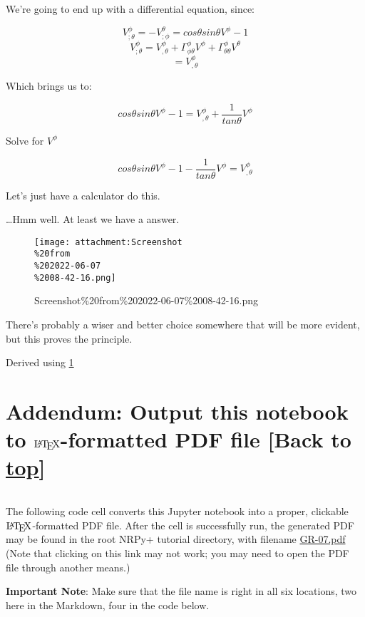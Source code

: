 \documentclass[landscape,letterpaper,10pt,english]{article}
\let\Oldlatex\LaTeX
\renewcommand{\LaTeX}{\textrm{\Oldlatex}}
\begin{document}
We're going to end up with a differential equation, since:

\[ V^\phi_{;\theta} = -V^\theta_{;\phi} = cos\theta sin\theta V^\phi - 1 \]
\[ V^\phi_{;\theta} = V^\phi_{,\theta} + \Gamma^\phi_{\phi\theta} V^\phi + \Gamma^\phi_{\theta\theta} V^\theta \]
\[ = V^\phi_{,\theta}\]

Which brings us to:

\[ cos\theta sin\theta V^\phi - 1 = V^\phi_{,\theta} + \frac{1}{tan\theta} V^\phi\]

Solve for \(V^\phi\)

    \[ cos\theta sin\theta V^\phi - 1 - \frac{1}{tan\theta} V^\phi = V^\phi_{,\theta} \]

Let's just have a calculator do this.

\ldots Hmm well. At least we have a answer.

\begin{figure}
\centering
\texttt{[image: attachment:Screenshot\\\%20from\\\%202022-06-07\\\%2008-42-16.png]}
\caption{Screenshot\%20from\%202022-06-07\%2008-42-16.png}
\end{figure}

There's probably a wiser and better choice somewhere that will be more
evident, but this proves the principle.

Derived using \hyperref[1]{1}

    \hypertarget{addendum-output-this-notebook-to-latex-formatted-pdf-file-back-to-top}{%
\section{\texorpdfstring{Addendum: Output this notebook to
\(\LaTeX\)-formatted PDF file {[}Back to
\hyperref[toc]{top}{]}}{Addendum: Output this notebook to \textbackslash LaTeX-formatted PDF file {[}Back to {]}}}\label{addendum-output-this-notebook-to-latex-formatted-pdf-file-back-to-top}}

\[\label{latex_pdf_output}\]

The following code cell converts this Jupyter notebook into a proper,
clickable \(\LaTeX\)-formatted PDF file. After the cell is successfully
run, the generated PDF may be found in the root NRPy+ tutorial
directory, with filename \url{GR-07.pdf} (Note that clicking on this
link may not work; you may need to open the PDF file through another
means.)

\textbf{Important Note}: Make sure that the file name is right in all
six locations, two here in the Markdown, four in the code below.
\end{document}
